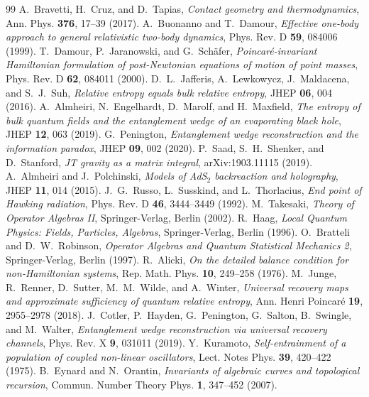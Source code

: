 \documentclass[11pt,a4paper,reqno]{article}
\theoremstyle{definition}
\numberwithin{equation}{section}
\begin{document}
\begin{thebibliography}{99}
 A.~Bravetti, H.~Cruz, and D.~Tapias, \textit{Contact geometry and thermodynamics}, Ann. Phys. \textbf{376}, 17--39 (2017).
 A.~Buonanno and T.~Damour, \textit{Effective one-body approach to general relativistic two-body dynamics}, Phys. Rev. D \textbf{59}, 084006 (1999).
 T.~Damour, P.~Jaranowski, and G.~Sch\"{a}fer, \textit{Poincar\'{e}-invariant Hamiltonian formulation of post-Newtonian equations of motion of point masses}, Phys. Rev. D \textbf{62}, 084011 (2000).
 D.~L.~Jafferis, A.~Lewkowycz, J.~Maldacena, and S.~J.~Suh, \textit{Relative entropy equals bulk relative entropy}, JHEP \textbf{06}, 004 (2016).
 A.~Almheiri, N.~Engelhardt, D.~Marolf, and H.~Maxfield, \textit{The entropy of bulk quantum fields and the entanglement wedge of an evaporating black hole}, JHEP \textbf{12}, 063 (2019).
 G.~Penington, \textit{Entanglement wedge reconstruction and the information paradox}, JHEP \textbf{09}, 002 (2020).
 P.~Saad, S.~H.~Shenker, and D.~Stanford, \textit{JT gravity as a matrix integral}, arXiv:1903.11115 (2019).
 A.~Almheiri and J.~Polchinski, \textit{Models of AdS$_2$ backreaction and holography}, JHEP \textbf{11}, 014 (2015).
 J.~G.~Russo, L.~Susskind, and L.~Thorlacius, \textit{End point of Hawking radiation}, Phys. Rev. D \textbf{46}, 3444--3449 (1992).
 M.~Takesaki, \textit{Theory of Operator Algebras II}, Springer-Verlag, Berlin (2002).
 R.~Haag, \textit{Local Quantum Physics: Fields, Particles, Algebras}, Springer-Verlag, Berlin (1996).
 O.~Bratteli and D.~W.~Robinson, \textit{Operator Algebras and Quantum Statistical Mechanics 2}, Springer-Verlag, Berlin (1997).
 R.~Alicki, \textit{On the detailed balance condition for non-Hamiltonian systems}, Rep. Math. Phys. \textbf{10}, 249--258 (1976).
 M.~Junge, R.~Renner, D.~Sutter, M.~M.~Wilde, and A.~Winter, \textit{Universal recovery maps and approximate sufficiency of quantum relative entropy}, Ann. Henri Poincar\'{e} \textbf{19}, 2955--2978 (2018).
 J.~Cotler, P.~Hayden, G.~Penington, G.~Salton, B.~Swingle, and M.~Walter, \textit{Entanglement wedge reconstruction via universal recovery channels}, Phys. Rev. X \textbf{9}, 031011 (2019).
 Y.~Kuramoto, \textit{Self-entrainment of a population of coupled non-linear oscillators}, Lect. Notes Phys. \textbf{39}, 420--422 (1975).
 B.~Eynard and N.~Orantin, \textit{Invariants of algebraic curves and topological recursion}, Commun. Number Theory Phys. \textbf{1}, 347--452 (2007).
\end{thebibliography}
\end{document}
